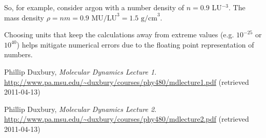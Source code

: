 \documentclass[twocolumn]{revtex4}
\begin{document}
So, for example, consider argon with a number density of $n=0.9$ LU$^{-3}$. The mass density $\rho = nm = 0.9\text{ MU/LU}^3 = 1.5\text{ g/cm}^3$.

Choosing units that keep the calculations away from extreme values (e.g. $10^{-25}$ or $10^{40}$) helps mitigate numerical errors due to the floating point representation of numbers.

\begin{thebibliography}{9}

	Phillip Duxbury,
	\emph{Molecular Dynamics Lecture 1}.
	\url{http://www.pa.msu.edu/~duxbury/courses/phy480/mdlecture1.pdf}
	(retrieved 2011-04-13)

	Phillip Duxbury,
	\emph{Molecular Dynamics Lecture 2}.
	\url{http://www.pa.msu.edu/~duxbury/courses/phy480/mdlecture2.pdf}
	(retrieved 2011-04-13)

\end{thebibliography}
\end{document}
